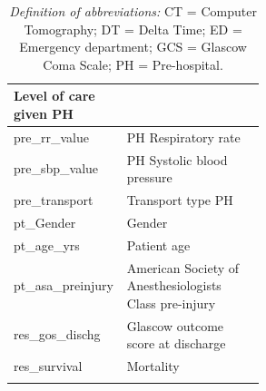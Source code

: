 \documentclass[12pt, a4paper]{article}
\begin{document}
\begin{appendices}
\begin{longtable}[c]{@{}|l|p{0.55\linewidth}|@{}}
		Level of care given PH                                                                   \\\hline pre\_rr\_value & PH Respiratory rate \\\hline pre\_sbp\_value & PH Systolic blood
		pressure                                                                                 \\\hline pre\_transport & Transport type PH \\\hline pt\_Gender & Gender \\\hline pt\_age\_yrs & Patient age
		\\\hline pt\_asa\_preinjury & American Society of Anesthesiologists Class pre-injury \\\hline res\_gos\_dischg &
		Glascow outcome score at discharge                                                       \\\hline res\_survival & Mortality \\\hline \caption*{\small \textit{Definition of
				abbreviations:} CT = Computer Tomography; DT = Delta Time; ED = Emergency department; GCS = Glascow Coma Scale; PH =
			Pre-hospital.}%
	\end{longtable}


\end{appendices}
\end{document}
